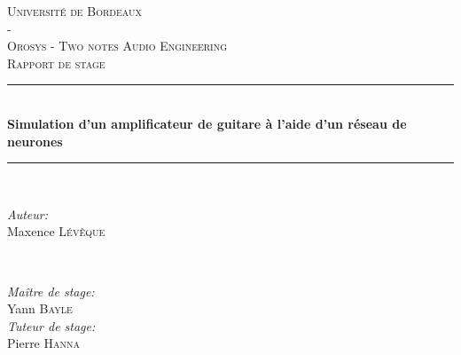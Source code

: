 \documentclass[a4paper]{article}
\begin{document}
\def\labelitemi{--}

\begin{titlepage}

  \newcommand{\HRule}{\rule{\linewidth}{0.5mm}} %
  \center    
  
  \textsc{\LARGE Université de Bordeaux}\\[0.5cm]
  \textsc{\LARGE -}\\[0.5cm]
  \textsc{\Large Orosys - Two notes Audio Engineering}\\[0.5cm]
  \textsc{\large Rapport de stage}\\[1cm]
  
  
  \HRule \\[0.4cm]
  { \huge \bfseries Simulation d'un amplificateur de guitare 
  à l'aide d'un réseau de neurones}\\[0.4cm]
  \HRule \\[2cm]
   
  
  \begin{minipage}{0.4\textwidth}
  \begin{flushleft} \large
  \emph{Auteur:}\\
  Maxence \textsc{Lévêque}
  \end{flushleft}
  \end{minipage}
  ~
  \begin{minipage}{0.4\textwidth}
  \begin{flushright} \large
  \emph{Maître de stage:} \\
  Yann \textsc{Bayle}\\[1cm]

  \emph{Tuteur de stage:}\\
  Pierre \textsc{Hanna}\\

  \end{flushright}
  \end{minipage}\\[2cm]


\end{titlepage}
\end{document}
